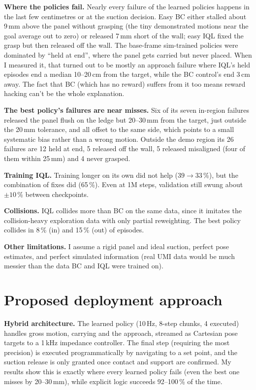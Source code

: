 \documentclass[10pt]{article}
\newcommand{\pct}{\,\%}
\newcommand{\para}[1]{\textbf{#1}}
\begin{document}
\para{Where the policies fail.} Nearly every failure of the learned policies happens in the last few
centimetres or at the suction decision. Easy BC either stalled about 9\,mm above the panel without grasping (the tiny demonstrated motions near the goal average out to zero) or released 7\,mm short of the wall; easy IQL fixed the grasp but then released off the wall. The base-frame sim-trained policies were dominated by
``held at end'', where the panel gets carried but never placed. When I measured it, that turned out to be
mostly an approach failure where IQL's held episodes end a median 10--20\,cm from the target, while the BC
control's end 3\,cm away. The fact that BC (which has no reward) suffers from it too means reward hacking can't be the whole explanation.

\para{The best policy's failures are near misses.} Six of its seven in-region failures released the panel flush on the ledge but 20--30\,mm from the target, just outside the 20\,mm tolerance, and all offset to the same side, which points to a small systematic bias rather than a wrong motion. Outside the demo region its 26 failures are 12 held at end, 5 released off the wall, 5 released misaligned (four of them within 25\,mm) and 4 never grasped.

\para{Training IQL.} Training longer on its own did not help ($39 \to 33$\pct), but the combination of fixes did (65\pct). Even at 1M steps, validation still swung about $\pm 10$\pct{} between checkpoints.

\para{Collisions.} IQL collides more than BC on the same data, since it imitates the collision-heavy exploration data with only partial reweighting. The best policy collides in 8\pct{} (in) and 15\pct{} (out) of episodes.

\para{Other limitations.} I assume a rigid panel and ideal suction, perfect pose estimates, and perfect simulated information (real UMI data would be much messier than the data BC and IQL were trained on).

\section{Proposed deployment approach}

\para{Hybrid architecture.} The learned policy (10\,Hz, 8-step chunks, 4 executed) handles gross motion,
carrying and the approach, streamed as Cartesian pose targets to a 1\,kHz impedance controller. The final step
(requiring the most precision) is executed programmatically by navigating to a set point, and the
suction release is only granted once contact and support are confirmed. My results show this is exactly where every learned policy fails (even the best one misses by 20--30\,mm), while explicit logic succeeds 92--100\pct{} of the time.
\end{document}
